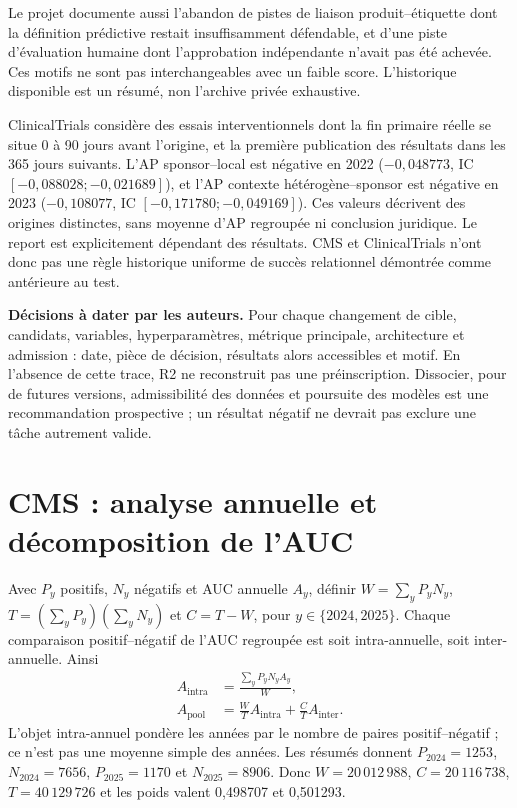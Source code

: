 \documentclass[10pt,a4paper]{article}
\begin{document}
Le projet documente aussi l'abandon de pistes de liaison produit--étiquette dont la définition prédictive restait insuffisamment défendable, et d'une piste d'évaluation humaine dont l'approbation indépendante n'avait pas été achevée. Ces motifs ne sont pas interchangeables avec un faible score. L'historique disponible est un résumé, non l'archive privée exhaustive\cite{hgbhistory}.

ClinicalTrials considère des essais interventionnels dont la fin primaire réelle se situe 0 à 90 jours avant l'origine, et la première publication des résultats dans les 365 jours suivants. L'AP sponsor--local est négative en 2022 ($-0,048773$, IC $[-0,088028;-0,021689]$), et l'AP contexte hétérogène--sponsor est négative en 2023 ($-0,108077$, IC $[-0,171780;-0,049169]$). Ces valeurs décrivent des origines distinctes, sans moyenne d'AP regroupée ni conclusion juridique. Le report est explicitement dépendant des résultats. CMS et ClinicalTrials n'ont donc pas une règle historique uniforme de succès relationnel démontrée comme antérieure au test.

\textbf{Décisions à dater par les auteurs.} Pour chaque changement de cible, candidats, variables, hyperparamètres, métrique principale, architecture et admission : date, pièce de décision, résultats alors accessibles et motif. En l'absence de cette trace, R2 ne reconstruit pas une préinscription. Dissocier, pour de futures versions, admissibilité des données et poursuite des modèles est une recommandation prospective ; un résultat négatif ne devrait pas exclure une tâche autrement valide.

\section{CMS : analyse annuelle et décomposition de l'AUC}
\label{supp:cms}
\begin{table}[!htbp]\centering\small
\caption{Métriques CMS transcrites de l'analyse gelée. 2023 est la validation ; 2024 et 2025 sont les partitions de test. AP selon les rangs du code.}

\end{table}

Avec $P_y$ positifs, $N_y$ négatifs et AUC annuelle $A_y$, définir $W=\sum_y P_yN_y$, $T=(\sum_y P_y)(\sum_y N_y)$ et $C=T-W$, pour $y\in\{2024,2025\}$. Chaque comparaison positif--négatif de l'AUC regroupée est soit intra-annuelle, soit inter-annuelle. Ainsi
\begin{align}
A_{\mathrm{intra}}&=\frac{\sum_y P_yN_y A_y}{W},\\
A_{\mathrm{pool}}&=\frac{W}{T}A_{\mathrm{intra}}+\frac{C}{T}A_{\mathrm{inter}}.
\end{align}
L'objet intra-annuel pondère les années par le nombre de paires positif--négatif ; ce n'est pas une moyenne simple des années. Les résumés donnent $P_{2024}=1253$, $N_{2024}=7656$, $P_{2025}=1170$ et $N_{2025}=8906$. Donc $W=20\,012\,988$, $C=20\,116\,738$, $T=40\,129\,726$ et les poids valent 0,498707 et 0,501293.
\end{document}
